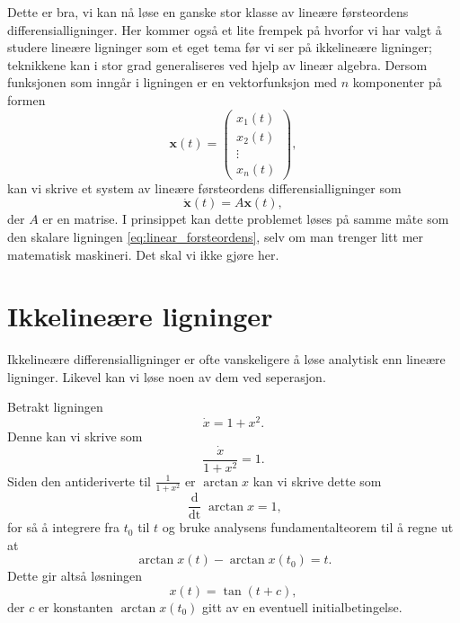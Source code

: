 \documentclass{article}
\theoremstyle{plain}
\theoremstyle{definition}
\theoremstyle{remark}
\newenvironment{ex}
{\pushQED{\qed}\renewcommand{\qedsymbol}{$\triangle$}\exx}
{\popQED\endexx}
\newcommand{\diff}[1]{\mathop{d#1}}
\newcommand{\fcn}{x}
\begin{document}
Dette er bra, vi kan nå løse en ganske stor klasse av lineære førsteordens differensialligninger. Her kommer også et lite frempek på hvorfor vi har valgt å studere lineære ligninger som et eget tema før vi ser på ikkelineære ligninger; teknikkene kan i stor grad generaliseres ved hjelp av lineær algebra. Dersom funksjonen som inngår i ligningen er en vektorfunksjon med $n$ komponenter på formen
\begin{equation*}
    \boldsymbol{x}(t) =
    \begin{pmatrix}
        x_1(t) \\
        x_2(t) \\
        \vdots \\
        x_n(t)
    \end{pmatrix},
\end{equation*}
kan vi skrive et system av lineære førsteordens differensialligninger som
\begin{equation*}
    \dot{\boldsymbol{x}}(t) = A \boldsymbol{x}(t),
\end{equation*}
der $A$ er en matrise. I prinsippet kan dette problemet løses på samme måte som den skalare ligningen \eqref{eq:linear_forsteordens}, selv om man trenger litt mer matematisk maskineri. Det skal vi ikke gjøre her.

\section*{Ikkelineære ligninger}

Ikkelineære differensialligninger er ofte vanskeligere å løse analytisk enn lineære ligninger. Likevel kan vi løse noen av dem ved seperasjon.

\begin{ex}
    Betrakt ligningen
    \begin{equation*}
        \dot{\fcn} = 1 + \fcn^2.
    \end{equation*}
    Denne kan vi skrive som
    \begin{equation*}
        \frac{\dot{\fcn}}{1 + \fcn^2} = 1.
    \end{equation*}
    Siden den antideriverte til $\frac{1}{1+\fcn^2}$ er $\arctan \fcn$ kan vi skrive dette som
    \begin{equation*}
        \frac{\diff{}}{\diff{t}} \arctan \fcn = 1,
    \end{equation*}
    for så å integrere fra $t_0$ til $t$ og bruke analysens fundamentalteorem til å regne ut at
    \begin{equation*}
        \arctan \fcn(t) - \arctan \fcn(t_0) = t.
    \end{equation*}
    Dette gir altså løsningen
    \begin{equation*}
        \fcn(t) = \tan(t + c),
    \end{equation*}
    der $c$ er konstanten $\arctan \fcn(t_0)$ gitt av en eventuell initialbetingelse.
\end{ex}
\end{document}
